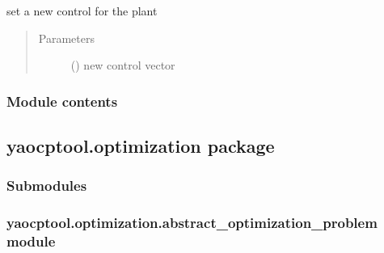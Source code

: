 \documentclass[letterpaper,10pt,english]{sphinxmanual}
\begin{document}
\begin{fulllineitems}
\begin{fulllineitems}
\begin{quote}
\begin{description}
\end{description}\end{quote}

\end{fulllineitems}


\begin{fulllineitems}
\label{\detokenize{yaocptool.mpc:yaocptool.mpc.plant.PlantSimulation.set_control}}
set a new control for the plant
\begin{quote}\begin{description}
\item[{Parameters}] \leavevmode
{} () \textendash{} new control vector

\end{description}\end{quote}

\end{fulllineitems}


\end{fulllineitems}



\subsubsection{Module contents}
\label{\detokenize{yaocptool.mpc:module-yaocptool.mpc}}\label{\detokenize{yaocptool.mpc:module-contents}}

\subsection{yaocptool.optimization package}
\label{\detokenize{yaocptool.optimization:yaocptool-optimization-package}}\label{\detokenize{yaocptool.optimization::doc}}

\subsubsection{Submodules}
\label{\detokenize{yaocptool.optimization:submodules}}

\subsubsection{yaocptool.optimization.abstract\_optimization\_problem module}
\label{\detokenize{yaocptool.optimization:module-yaocptool.optimization.abstract_optimization_problem}}\label{\detokenize{yaocptool.optimization:yaocptool-optimization-abstract-optimization-problem-module}}
\end{document}
